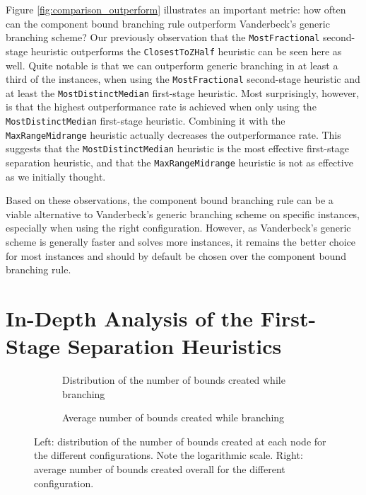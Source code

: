 Figure \ref{fig:comparison_outperform} illustrates an important metric: how often can the component bound branching rule outperform Vanderbeck's generic branching scheme? Our previously observation that the \texttt{MostFractional} second-stage heuristic outperforms the \texttt{ClosestToZHalf} heuristic can be seen here as well. Quite notable is that we can outperform generic branching in at least a third of the instances, when using the \texttt{MostFractional} second-stage heuristic and at least the \texttt{MostDistinctMedian} first-stage heuristic. Most surprisingly, however, is that the highest outperformance rate is achieved when only using the \texttt{MostDistinctMedian} first-stage heuristic. Combining it with the \texttt{MaxRangeMidrange} heuristic actually decreases the outperformance rate. This suggests that the \texttt{MostDistinctMedian} heuristic is the most effective first-stage separation heuristic, and that the \texttt{MaxRangeMidrange} heuristic is not as effective as we initially thought.

Based on these observations, the component bound branching rule can be a viable alternative to Vanderbeck's generic branching scheme on specific instances, especially when using the right configuration. However, as Vanderbeck's generic scheme is generally faster and solves more instances, it remains the better choice for most instances and should by default be chosen over the component bound branching rule.

\section{In-Depth Analysis of the First-Stage Separation Heuristics}\label{sec:evaluation_comparison_separation_firststage}

\begin{figure}
	\centering

	\begin{subfigure}{0.495\textwidth}
		\centering
		
		\caption{Distribution of the number of bounds created while branching}
		\label{fig:compbnd-mrm_num_bounds}
	\end{subfigure}
	\hfill
	\begin{subfigure}{0.495\textwidth}
		\centering
		
		\caption{Average number of bounds created while branching}
		\label{fig:compbnd_avg_num_bounds}
	\end{subfigure}

	\caption{Left: distribution of the number of bounds created at each node for the different configurations. Note the logarithmic scale. Right: average number of bounds created overall for the different configuration.}
	\label{fig:comparison_bounds}
\end{figure}

